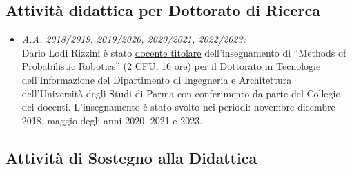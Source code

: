 \documentclass[11pt]{article}
\newcommand{\ITEMDATE}[1]{\item \textit{#1:}\\}
\begin{document}
\subsection*{Attivit\`a didattica per Dottorato di Ricerca}

\begin{itemize}

\ITEMDATE{A.A. 2018/2019, 2019/2020, 2020/2021, 2022/2023}
Dario Lodi Rizzini \`e stato \underline{docente titolare} dell'insegnamento di ``Methods of Probabilistic Robotics'' (2 CFU, 16 ore)
per il Dottorato in Tecnologie dell'Informazione del Dipartimento di Ingegneria e Architettura 
dell'Universit\`a degli Studi di Parma con conferimento da parte del Collegio dei docenti. 
L'insegnamento \`e stato svolto nei periodi: novembre-dicembre 2018, maggio degli anni 2020, 2021 e 2023. 

\end{itemize}

\subsection*{Attivit\`a di Sostegno alla Didattica}
\end{document}
